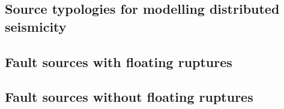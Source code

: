 \subsection{Source typologies for modelling distributed seismicity}


\subsection{Fault sources with floating ruptures}


\subsection{Fault sources without floating ruptures}

